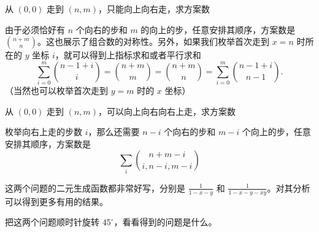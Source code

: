     \begin{example}
        从 $(0,0)$ 走到 $(n,m)$，只能向上向右走，求方案数
    \end{example}
    \begin{solution}
        由于必须恰好有 $n$ 个向右的步和 $m$ 的向上的步，任意安排其顺序，方案数是 $\binom{n+m}{n}$。这也展示了组合数的对称性。另外，如果我们枚举首次走到 $x=n$ 时所在的 $y$ 坐标 $i$，就可以得到上指标求和或者平行求和
        $$
        \sum_{i=0}^m\binom{n-1+i}{i}=\binom{n+m}{m}=\binom{n+m}{n}=\sum_{i=0}^m\binom{n-1+i}{n-1}.
        $$
        （当然也可以枚举首次走到 $y=m$ 时的 $x$ 坐标）
    \end{solution}

    \begin{example}
        从 $(0,0)$ 走到 $(n,m)$，可以向上向右向右上走，求方案数
    \end{example}
    \begin{solution}
        枚举向右上走的步数 $i$，那么还需要 $n-i$ 个向右的步和 $m-i$ 个向上的步，任意安排其顺序，方案数是
        $$
        \sum_{i}\binom{n+m-i}{i,n-i,m-i}
        $$
    \end{solution}
    \begin{remark}
        这两个问题的二元生成函数都非常好写，分别是 $\frac{1}{1-x-y}$ 和 $\frac{1}{1-x-y-xy}$。对其分析可以得到更多有用的结果。
    \end{remark}
    \begin{remark}
        把这两个问题顺时针旋转 $45^\circ$，看看得到的问题是什么。
    \end{remark}
    
